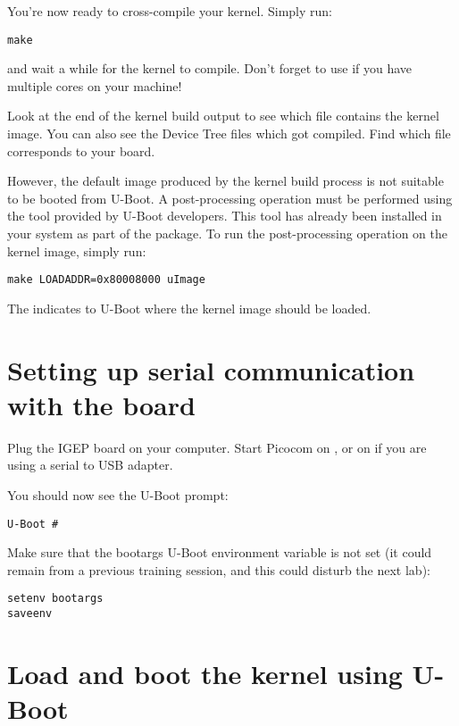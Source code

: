 You're now ready to cross-compile your kernel. Simply run:

\begin{verbatim}
make
\end{verbatim}

and wait a while for the kernel to compile. Don't forget to use
 if you have multiple cores on your machine!

Look at the end of the kernel build output to see which file contains
the kernel image. You can also see the Device Tree  files
which got compiled. Find which  file corresponds to your
board.

However, the default image produced by the kernel build process is not
suitable to be booted from U-Boot. A post-processing operation must be
performed using the  tool provided by U-Boot developers. This
tool has already been installed in your system as part of the
 package. To run the post-processing operation on
the kernel image, simply run:

\begin{verbatim}
make LOADADDR=0x80008000 uImage
\end{verbatim}

The  indicates to U-Boot where the kernel image should
be loaded.

\section{Setting up serial communication with the board}

Plug the IGEP board on your computer. Start Picocom on
, or on  if you are using a serial
to USB adapter.

You should now see the U-Boot prompt:

\begin{verbatim}
U-Boot #
\end{verbatim}

Make sure that the bootargs U-Boot environment variable is not set (it
could remain from a previous training session, and this could disturb
the next lab):

\begin{verbatim}
setenv bootargs
saveenv
\end{verbatim}

\section{Load and boot the kernel using U-Boot}

